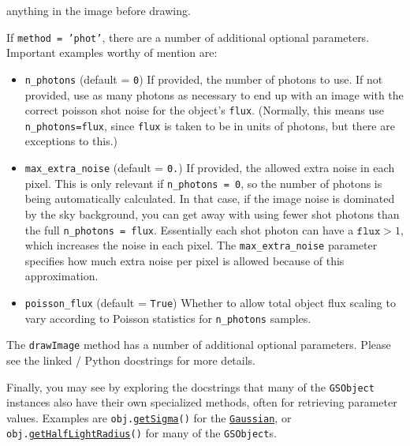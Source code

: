 \documentclass[preprint,11pt]{../../devel/modules/aastex}
\begin{document}
\begin{itemize}
{\begin{itemize}
    anything in the image before drawing.
\end{itemize}
If \texttt{method = 'phot'}, there are a number of additional optional parameters. Important
examples worthy of mention are:
\begin{itemize}
  \item \texttt{n\_photons} (default = \texttt{0}) \newline If provided,
    the number of photons to use.  If not provided, use as many photons
    as necessary to end up with an image with the correct poisson shot
    noise for the object's \texttt{flux}.  (Normally, this means use \texttt{n\_photons=flux},
    since \texttt{flux} is taken to be in units of photons, but there are exceptions to this.)
  \item \texttt{max\_extra\_noise} (default = \texttt{0.}) \newline If
    provided, the allowed extra noise in each pixel.  This is only
    relevant if \texttt{n\_photons = 0}, so the number of photons is
    being automatically calculated.  In that case, if the image noise is
    dominated by the sky background, you can get away with using fewer
    shot photons than the full \texttt{n\_photons = flux}.  Essentially
    each shot photon can have a $\texttt{flux} > 1$, which increases the
    noise in each pixel.  The \texttt{max\_extra\_noise} parameter
    specifies how much extra noise per pixel is allowed because of this
    approximation.
  \item \texttt{poisson\_flux} (default = \texttt{True}) \newline
    Whether to allow total object flux scaling to vary according to
    Poisson statistics for \texttt{n\_photons} samples.
\end{itemize}
The \texttt{drawImage} method has a number of additional optional
 parameters.  Please see the linked / Python docstrings for more
 details.
 }
\end{itemize}

Finally, you may see by exploring the docstrings that many of the \texttt{GSObject}
instances also have their own specialized methods, often for
retrieving parameter values. Examples are
  \texttt{obj.}\href{http://galsim-developers.github.com/GalSim/classgalsim_1_1base_1_1_gaussian.html#a418f2826a7b8934cfedc181de23ce826}{\texttt{getSigma}}\texttt{()}
for the
\href{http://galsim-developers.github.com/GalSim/classgalsim_1_1base_1_1_gaussian.html}{\texttt{Gaussian}},
or
  \texttt{obj.}\href{http://galsim-developers.github.com/GalSim/classgalsim_1_1base_1_1_sersic.html#ad6ca39293c6b478fc052d07ea51d086f}{\texttt{getHalfLightRadius}}\texttt{()}
for many of the \texttt{GSObject}s.
\end{document}
